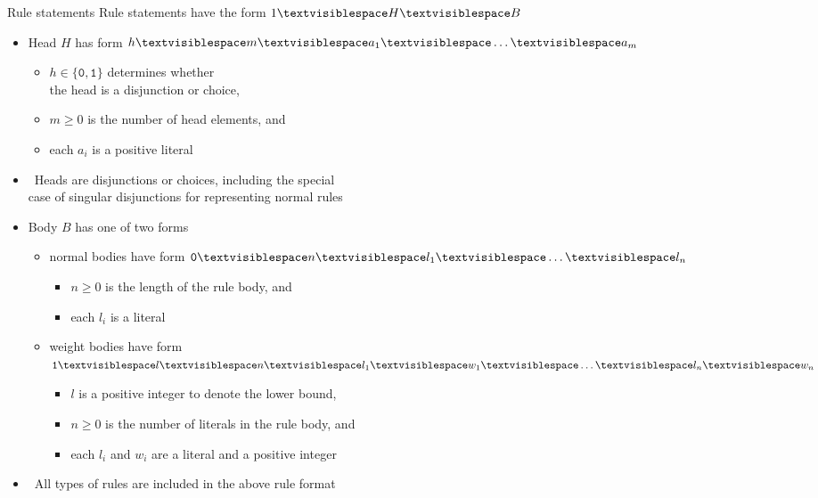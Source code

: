 \begin{frame}{Rule statements}
  \newcommand\Space{\textvisiblespace}
  Rule statements have the form
  \hfill \(1 \Space H \Space B\)\qquad\qquad
  \smallskip
  \begin{itemize}
  \item<2-> Head $H$ has form
    \hfill\(h \Space m \Space a_1 \Space \dots \Space a_m\)\qquad\qquad
    \begin{itemize}
    \item $h \in \{\texttt{0},\texttt{1}\}$ determines whether\\ the head is a disjunction or choice,
    \item $m \geq 0$ is the number of head elements, and
    \item each $a_i$ is a positive literal
    \end{itemize}
    \smallskip
  \item<only@3>  \
    Heads are disjunctions or choices, including the special\\ case of singular disjunctions for representing normal rules
  \item<only@4-> Body $B$ has one of two forms
    \begin{itemize}
    \item normal bodies have form
      \hfill\(\texttt{0} \Space n \Space l_{1} \Space \dots \Space l_n\)\qquad\qquad
      \begin{itemize}
      \item $n \geq 0$ is the length of the rule body, and
      \item each $l_i$ is a literal
      \end{itemize}
    \item weight bodies have form
      \hfill\(\texttt{1} \Space l \Space n \Space l_1 \Space w_1  \Space \dots \Space l_n \Space w_n\)\qquad\qquad
      \begin{itemize}
      \item $l$ is a positive integer to denote the lower bound,
      \item $n \geq 0$ is the number of literals in the rule body, and
      \item each $l_i$ and $w_i$ are a literal and a positive integer
      \end{itemize}
    \end{itemize}

  \item<only@5>   \
    All types of rules are included in the above rule format
  \end{itemize}
\end{frame}
